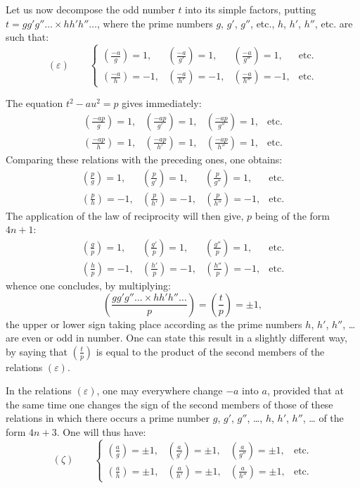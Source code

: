 \documentclass[11pt]{article}
\newcommand{\leg}[2]{\left(\frac{#1}{#2}\right)}
\newcommand{\unitid}[1]{\hypertarget{#1}{}}
\begin{document}
\unitid{dirichlet.v1.p04b.en.par.021}Let us now decompose the odd number $t$ into its simple factors, putting $t=gg'g''\ldots{}\times hh'h''\ldots$, where the prime numbers $g$, $g'$, $g''$, etc., $h$, $h'$, $h''$, etc. are such that:
\unitid{dirichlet.v1.p04b.en.eq.014}
\[
(\varepsilon)\qquad
\left\{
\begin{array}{llll}
\leg{-a}{g}=1,& \leg{-a}{g'}=1,& \leg{-a}{g''}=1,& \text{etc.}\\[0.3em]
\leg{-a}{h}=-1,& \leg{-a}{h'}=-1,& \leg{-a}{h''}=-1,& \text{etc.}
\end{array}
\right.
\]

\unitid{dirichlet.v1.p04b.en.par.022}The equation $t^2-au^2=p$ gives immediately:
\unitid{dirichlet.v1.p04b.en.eq.015}
\[
\begin{array}{llll}
\leg{-ap}{g}=1,& \leg{-ap}{g'}=1,& \leg{-ap}{g''}=1,& \text{etc.}\\[0.3em]
\leg{-ap}{h}=1,& \leg{-ap}{h'}=1,& \leg{-ap}{h''}=1,& \text{etc.}
\end{array}
\]
Comparing these relations with the preceding ones, one obtains:
\unitid{dirichlet.v1.p04b.en.eq.016}
\[
\begin{array}{llll}
\leg{p}{g}=1,& \leg{p}{g'}=1,& \leg{p}{g''}=1,& \text{etc.}\\[0.3em]
\leg{p}{h}=-1,& \leg{p}{h'}=-1,& \leg{p}{h''}=-1,& \text{etc.}
\end{array}
\]
The application of the law of reciprocity will then give, $p$ being of the form $4n+1$:
\unitid{dirichlet.v1.p04b.en.eq.017}
\[
\begin{array}{llll}
\leg{g}{p}=1,& \leg{g'}{p}=1,& \leg{g''}{p}=1,& \text{etc.}\\[0.3em]
\leg{h}{p}=-1,& \leg{h'}{p}=-1,& \leg{h''}{p}=-1,& \text{etc.}
\end{array}
\]
whence one concludes, by multiplying:
\unitid{dirichlet.v1.p04b.en.eq.018}
\[
\leg{gg'g''\ldots{}\times hh'h''\ldots}{p}=\leg{t}{p}=\pm1,
\]
the upper or lower sign taking place according as the prime numbers $h$, $h'$, $h''$, \ldots{} are even or odd in number. One can state this result in a slightly different way, by saying that $\leg{t}{p}$ is equal to the product of the second members of the relations $(\varepsilon)$.

\unitid{dirichlet.v1.p04b.en.par.023}In the relations $(\varepsilon)$, one may everywhere change $-a$ into $a$, provided that at the same time one changes the sign of the second members of those of these relations in which there occurs a prime number $g$, $g'$, $g''$, \ldots{}, $h$, $h'$, $h''$, \ldots{} of the form $4n+3$. One will thus have:
\unitid{dirichlet.v1.p04b.en.eq.019}
\[
(\zeta)\qquad
\left\{
\begin{array}{llll}
\leg{a}{g}=\pm1,& \leg{a}{g'}=\pm1,& \leg{a}{g''}=\pm1,& \text{etc.}\\[0.3em]
\leg{a}{h}=\pm1,& \leg{a}{h'}=\pm1,& \leg{a}{h''}=\pm1,& \text{etc.}
\end{array}
\right.
\]
\end{document}
